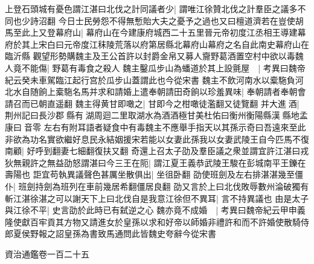 上登石頭城有憂色謂江湛曰北伐之計同議者少|{
	謂唯江徐贊北伐之計羣臣之議多不同也少詩沼翻}
今日士民勞怨不得無慙貽大夫之憂予之過也又曰檀道濟若在豈使胡馬至此上又登幕府山|{
	幕府山在今建康府城西二十五里晉元帝初度江丞相王導建幕府於其上宋白曰元帝度江秣陵荒落以府第居縣北幕府山幕府之名自此南史幕府山在臨沂縣}
觀望形勢購魏主及王公首許以封爵金帛又募人齎野葛酒置空村中欲以毒魏人竟不能傷|{
	野葛有毒食之殺人}
魏主鑿瓜步山為蟠道於其上設氈屋　|{
	考異曰魏帝紀云癸未車駕臨江起行宫於瓜步山蓋謂此也今從宋書}
魏主不飲河南水以槖駞負河北水自随餉上槖駞名馬并求和請婚上遣奉朝請田奇餉以珍羞異味|{
	奉朝請者奉朝會請召而已朝直遥翻}
魏主得黄甘即噉之|{
	甘即今之柑噉徒濫翻又徒覽翻}
并大進酒|{
	荆州記曰長沙郡縣有湖周迴二里取湖水為酒酒極甘美杜佑曰衡州衡陽縣漢縣地孟康曰音零}
左右有附耳語者疑食中有毒魏主不應舉手指天以其孫示奇曰吾遠來至此非欲為功名實欲繼好息民永結姻援宋若能以女妻此孫我以女妻武陵王自今匹馬不復南顧|{
	好呼到翻妻七細翻復扶又翻}
奇還上召太子劭及羣臣議之衆並謂宜許江湛曰戎狄無親許之無益劭怒謂湛曰今三王在阨|{
	謂江夏王義恭武陵王駿在彭城南平王鑠在壽陽也}
詎宜苟執異議聲色甚厲坐散俱出|{
	坐徂卧翻}
劭使班劍及左右排湛湛幾至僵仆|{
	班劍持劍為班列在車前幾居希翻僵居良翻}
劭又言於上曰北伐敗辱數州淪破獨有斬江湛徐湛之可以謝天下上曰北伐自是我意江徐但不異耳|{
	言不持異議也}
由是太子與江徐不平|{
	史言劭於此時已有弑逆之心}
魏亦竟不成婚　|{
	考異曰魏帝紀云甲申義隆使獻百牢貢其方物又請進女於皇孫以求和好帝以師婚非禮許和而不許婚使散騎侍郎夏侯野報之詔皇孫為書致馬通問此皆魏史夸辭今從宋書}


資治通鑑卷一百二十五
